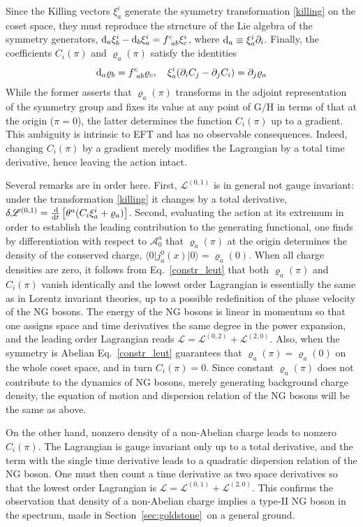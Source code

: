 \documentclass[final,2p,times,12pt,sort&compress]{elsarticle}
\newcommand\gr[1]{\mathrm{#1}}              %
\newcommand\Lag{\mathscr{L}}                %
\newcommand\AAA{\mathscr{A}}                %
\newcommand\bra[1]{\langle#1\vert}          %
\newcommand\ket[1]{\vert#1\rangle}          %
\newcommand\de{\partial}
\newcommand\vr{\varrho}
\newcommand\vt{\theta}
\newcommand\OD[2]{\frac{\dd #1}{\dd #2}}    %
\newcommand\dd{\mathop{{\rm d}\!}\nolimits} %
\begin{document}
Since the Killing vectors $\xi^i_a$ generate the symmetry transformation
\eqref{killing} on the coset space, they must reproduce the structure of the
Lie algebra of the symmetry generators, $\dd{}_a\xi^i_b-\dd{}_b\xi^i_a=f^c_{\
ab}\xi^i_c$, where $\dd{}_a\equiv\xi^i_a\de_i$. Finally, the coefficients
$C_i(\pi)$ and $\vr_a(\pi)$ satisfy the identities
\begin{equation}
\dd{}_a\vr_b=f^c_{\ ab}\vr_c,\quad \xi^i_a(\de_iC_j-\de_jC_i)=\de_j\vr_a
\label{constr_leut}
\end{equation}
While the former asserts that $\vr_a(\pi)$ transforms in the adjoint
representation of the symmetry group and fixes its value at any point of
$\gr{G/H}$ in terms of that at the origin ($\pi=0$), the latter determines the
function $C_i(\pi)$ up to a gradient. This ambiguity is intrinsic to EFT and has
no observable consequences. Indeed, changing $C_i(\pi)$ by a gradient merely
modifies the Lagrangian by a total time derivative, hence leaving the action
intact.

Several remarks are in order here. First, $\Lag^{(0,1)}$ is in general not
gauge invariant: under the transformation \eqref{killing} it changes by a total
derivative, $\delta\Lag^{(0,1)}=\OD{}{t}\left[\vt^a(C_i\xi^i_a+\vr_a)\right]$.
Second, evaluating the action at its extremum in order to establish the leading
contribution to the generating functional, one finds by differentiation with
respect to $\AAA^a_0$ that $\vr_a(\pi)$ at the origin determines the density of
the conserved charge, $\bra0j^0_a(x)\ket0=\vr_a(0)$. When all charge
densities are zero, it follows from Eq.~\eqref{constr_leut} that both
$\vr_a(\pi)$ and $C_i(\pi)$ vanish identically and the lowest order Lagrangian
is essentially the same as in Lorentz invariant theories, up to a possible
redefinition of the phase velocity of the NG bosons. The energy of the NG
bosons is linear in momentum so that one assigns space and time derivatives the
same degree in the power expansion, and the leading order Lagrangian reads
$\Lag=\Lag^{(0,2)}+\Lag^{(2,0)}$. Also, when the symmetry is Abelian
Eq.~\eqref{constr_leut} guarantees that $\vr_a(\pi)=\vr_a(0)$ on the whole
coset space, and in turn $C_i(\pi)=0$. Since constant $\vr_a(\pi)$ does not
contribute to the dynamics of NG bosons, merely generating background charge
density, the equation of motion and dispersion relation of the NG bosons will
be the same as above.

On the other hand, nonzero density of a non-Abelian charge leads to nonzero
$C_i(\pi)$. The Lagrangian is gauge invariant only up to a total derivative, and
the term with the single time derivative leads to a quadratic dispersion
relation of the NG boson. One must then count a time derivative as two space
derivatives so that the lowest order Lagrangian is
$\Lag=\Lag^{(0,1)}+\Lag^{(2,0)}$. This confirms the observation that density of
a non-Abelian charge implies a type-II NG boson in the spectrum, made in
Section~\ref{sec:goldstone}\ on a general ground.
\end{document}
